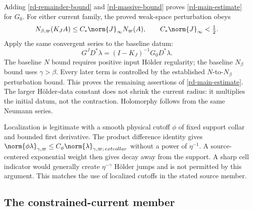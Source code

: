 Adding \eqref{rd-remainder-bound} and \eqref{rd-massive-bound}
proves \eqref{rd-main-estimate} for $G_0$. For either current
family, the proved weak-space perturbation obeys
\[
 N_{\beta,\varpi}(K_JA)
       \le C_*\norm{J}_\infty N_\varpi(A),\qquad
 C_*\norm{J}_\infty<\tfrac12.
\]
Apply the same convergent series to the baseline datum:
\begin{equation}\label{rd-current-transfer}
 G^JD^*\lambda=(I-K_J)^{-1}G_0D^*\lambda.
\end{equation}
The baseline $N$ bound requires positive input H\"older regularity;
the baseline $N_\beta$ bound uses $\gamma>\beta$. Every later term
is controlled by the established $N$-to-$N_\beta$ perturbation
bound. This proves the remaining assertions of
\eqref{rd-main-estimate}. The larger H\"older-data constant does
not shrink the current radius: it multiplies the initial datum,
not the contraction. Holomorphy follows from the same Neumann series.

Localization is legitimate with a smooth physical cutoff $\phi$
of fixed support collar and bounded first derivative. The product
difference identity gives
$\norm{\phi\lambda}_{\gamma,\varpi}
 \le C_\phi\norm{\lambda}_{\gamma,\varpi;\,	ext{collar}}$
without a power of $\eta^{-1}$. A source-centered exponential weight
then gives decay away from the support. A sharp cell indicator
would generally create $\eta^{-\gamma}$ H\"older jumps and is not
permitted by this argument. This matches the use of localized
cutoffs in the stated source member.

\subsection{The constrained-current member}

